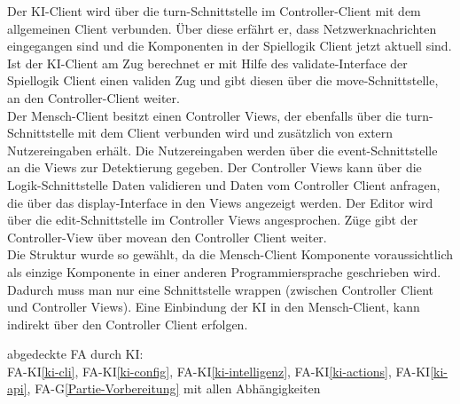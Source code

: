 Der KI-Client wird über die turn-Schnittstelle im Controller-Client mit dem allgemeinen Client verbunden. Über diese erfährt er, dass Netzwerknachrichten eingegangen sind und die Komponenten in der Spiellogik Client jetzt aktuell sind. Ist der KI-Client am Zug berechnet er mit Hilfe des validate-Interface der Spiellogik Client einen validen Zug und gibt diesen über die move-Schnittstelle, an den Controller-Client weiter.\\
Der Mensch-Client besitzt einen Controller Views, der ebenfalls über die turn-Schnittstelle mit dem Client verbunden wird und zusätzlich von extern Nutzereingaben erhält. Die Nutzereingaben werden über die event-Schnittstelle an die Views zur Detektierung gegeben. Der Controller Views kann über die Logik-Schnittstelle Daten validieren und Daten vom Controller Client anfragen, die über das display-Interface in den Views angezeigt werden. Der Editor wird über die edit-Schnittstelle im Controller Views angesprochen. Züge gibt der Controller-View über \glqq move\grqq an den Controller Client weiter.\\
Die Struktur wurde so gewählt, da die Mensch-Client Komponente voraussichtlich als einzige Komponente in einer anderen Programmiersprache geschrieben wird. Dadurch muss man nur eine Schnittstelle wrappen (zwischen Controller Client und Controller Views). Eine Einbindung der KI in den Mensch-Client, kann indirekt über den Controller Client erfolgen.\\
\newline
abgedeckte FA durch KI:\\
FA-KI\ref{ki-cli}, FA-KI\ref{ki-config}, FA-KI\ref{ki-intelligenz}, FA-KI\ref{ki-actions}, FA-KI\ref{ki-api}, FA-G\ref{Partie-Vorbereitung} mit allen Abhängigkeiten\\
